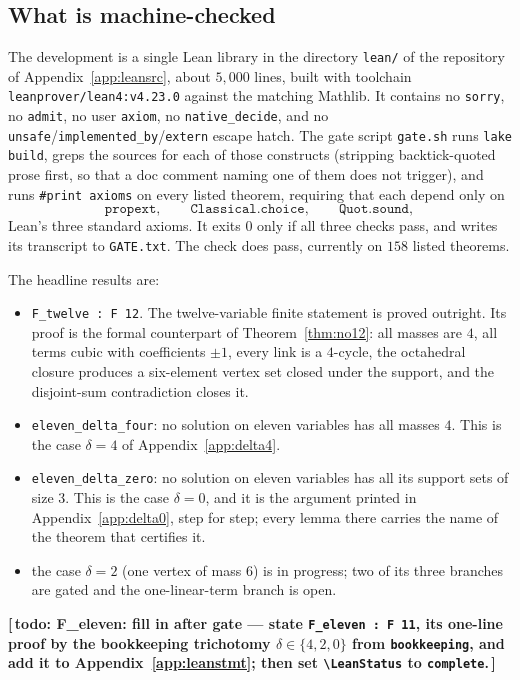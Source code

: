 \documentclass[11pt,reqno]{amsart}
\theoremstyle{plain}
\theoremstyle{definition}
\numberwithin{theorem}{section}
\newcommand{\todo}[1]{\textup{\textbf{[\,todo: #1\,]}}}
\newif\ifleandone
\newcommand{\leanstate}[2]{\ifleandone #1\else #2\fi}
\begin{document}
\subsection{What is machine-checked}
The development is a single Lean library in the directory \texttt{lean/} of the repository of
Appendix~\ref{app:leansrc}, about $5{,}000$ lines, built with toolchain
\texttt{leanprover/lean4:v4.23.0} against the matching Mathlib. It contains no \texttt{sorry},
no \texttt{admit}, no user \texttt{axiom}, no \texttt{native\_decide}, and no
\texttt{unsafe}/\texttt{implemented\_by}/\texttt{extern} escape hatch. The gate script
\texttt{gate.sh} runs \texttt{lake build}, greps the sources for each of those constructs
(stripping backtick-quoted prose first, so that a doc comment naming one of them does not
trigger), and runs \texttt{\#print axioms} on every listed theorem, requiring that each depend
only on
\[
  \texttt{propext}, \qquad \texttt{Classical.choice}, \qquad \texttt{Quot.sound},
\]
Lean's three standard axioms. It exits $0$ only if all three checks pass, and writes its
transcript to \texttt{GATE.txt}. The check does pass, currently on $158$ listed theorems.

The headline results are:
\begin{itemize}[leftmargin=1.4em]
  \item \texttt{F\_twelve : F 12}. The twelve-variable finite statement is proved outright.
  Its proof is the formal counterpart of Theorem~\ref{thm:no12}: all masses are $4$, all terms
  cubic with coefficients $\pm1$, every link is a $4$-cycle, the octahedral closure produces a
  six-element vertex set closed under the support, and the disjoint-sum contradiction closes it.
  \item \texttt{eleven\_delta\_four}: no solution on eleven variables has all masses $4$. This
  is the case $\delta = 4$ of Appendix~\ref{app:delta4}.
  \item \texttt{eleven\_delta\_zero}: no solution on eleven variables has all its support sets
  of size $3$. This is the case $\delta = 0$, and it is the argument printed in
  Appendix~\ref{app:delta0}, step for step; every lemma there carries the name of the theorem
  that certifies it.
  \item \leanstate{\texttt{eleven\_delta\_two}: the case $\delta = 2$, one vertex of mass $6$
  and the rest of mass $4$.}{the case $\delta = 2$ (one vertex of mass $6$) is in progress; two
  of its three branches are gated and the one-linear-term branch is open.}
\end{itemize}
\ifleandone
The three cases are assembled into
\[
  \texttt{F\_eleven : F 11},
\]
so that both finite statements needed for $R_3 = 10$ are machine-checked.
\else
\todo{F\_eleven: fill in after gate --- state \texttt{F\_eleven : F 11}, its one-line proof by
the bookkeeping trichotomy $\delta \in \{4,2,0\}$ from \texttt{bookkeeping}, and add it to
Appendix~\ref{app:leanstmt}; then set \texttt{\textbackslash LeanStatus} to
\texttt{complete}.}
\fi
\end{document}
